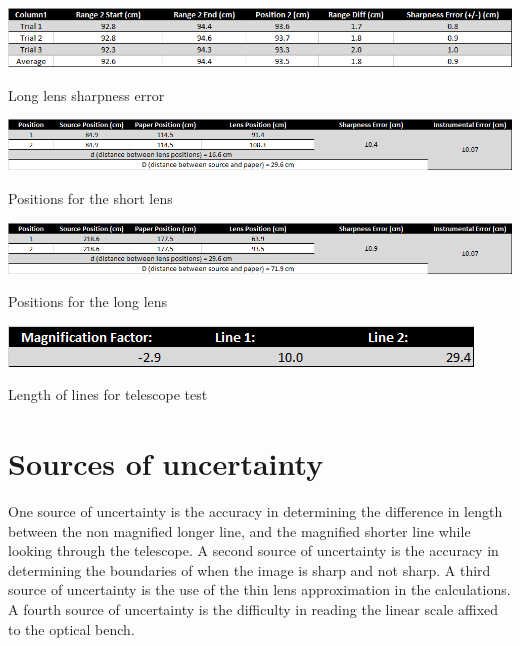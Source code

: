 \documentclass{report}
\begin{document}
\begin{table}[H]
    \centering
    \includegraphics[width = \textwidth]{longLensSharpnessError.png}
    \caption{Long lens sharpness error}
    \label{longLensSharpnessError}
\end{table}

\begin{table}[H]
    \centering
    \includegraphics[width = \textwidth]{shortLensPositions.png}
    \caption{Positions for the short lens}
    \label{shortLensPositions}
\end{table}
\bigskip

\begin{table}[H]
    \centering
    \includegraphics[width = \textwidth]{longLensPositions.png}
    \caption{Positions for the long lens}
    \label{longLensPositions}
\end{table}
\bigskip

\begin{table}[H]
    \centering
    \includegraphics[width = \textwidth]{telescopeTest.png}
    \caption{Length of lines for telescope test}
    \label{telescopeTest}
\end{table}
\bigskip



\chapter{Sources of uncertainty}
One source of uncertainty is the accuracy in determining the difference in length between the non magnified longer line, and the magnified shorter line while looking through the telescope.
A second source of uncertainty is the accuracy in determining the boundaries of when the image is sharp and not sharp.
A third source of uncertainty is the use of the thin lens approximation in the calculations.
A fourth source of uncertainty is the difficulty in reading the linear scale affixed to the optical bench.
\end{document}

